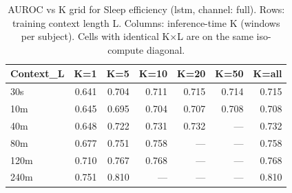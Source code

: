 \begin{table}[ht]
\centering
\caption{AUROC vs K grid for Sleep efficiency (lstm, channel: full). Rows: training context length L. Columns: inference-time K (windows per subject). Cells with identical K×L are on the same iso-compute diagonal.}
\label{tab:kgrid_sleep_efficiency_binary_lstm_full}
\begin{tabular}{lrrrrrr}
\toprule
Context_L & K=1 & K=5 & K=10 & K=20 & K=50 & K=all \\
\midrule
30s & 0.641 & 0.704 & 0.711 & 0.715 & 0.714 & 0.715 \\
10m & 0.645 & 0.695 & 0.704 & 0.707 & 0.708 & 0.708 \\
40m & 0.648 & 0.722 & 0.731 & 0.732 & — & 0.732 \\
80m & 0.677 & 0.751 & 0.758 & — & — & 0.758 \\
120m & 0.710 & 0.767 & 0.768 & — & — & 0.768 \\
240m & 0.751 & 0.810 & — & — & — & 0.810 \\
\bottomrule
\end{tabular}
\end{table}